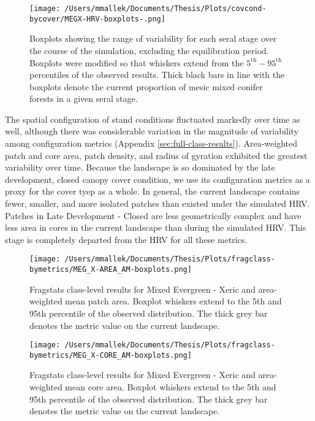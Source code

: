 \begin{figure}[!htbp]
  \centering
    \texttt{[image: /Users/mmallek/Documents/Thesis/Plots/covcond-bycover/MEGX-HRV-boxplots-.png]}
  \caption{Boxplots showing the range of variability for each seral stage over the course of the simulation, excluding the equilibration period. Boxplots were modified so that whiskers extend from the $5^{\text{th}} - 95^{\text{th}}$ percentiles of the observed results. Thick black bars in line with the boxplots denote the current proportion of mesic mixed conifer forests in a given seral stage.} 
  \label{fig:covcond_megx_boxplots}
\end{figure}

The spatial configuration of stand conditions fluctuated markedly over time as well, although there was considerable variation in the magnitude of variability among configuration metrics (Appendix \ref{sec:full-class-results}). Area-weighted patch and core area, patch density, and radius of gyration exhibited the greatest variability over time. Because the landscape is so dominated by the late development, closed canopy cover condition, we use its configuration metrics as a proxy for the cover tyep as a whole. In general, the current landscape contains fewer, smaller, and more isolated patches than existed under the simulated HRV. Patches in Late Development - Closed are less geometrically complex and have less area in cores in the current landscape than during the simulated HRV. This stage is completely departed from the HRV for all these metrics.

\begin{figure}[!htbp]
\centering
    \texttt{[image: /Users/mmallek/Documents/Thesis/Plots/fragclass-bymetrics/MEG\_X-AREA\_AM-boxplots.png]}
  \caption{Fragstats class-level results for Mixed Evergreen - Xeric and area-weighted mean patch area. Boxplot whiskers extend to the 5th and 95th percentile of the observed distribution. The thick grey bar denotes the metric value on the current landscape.}
  \label{fig:megx_areaam}
\end{figure}


\begin{figure}[!htbp]
\centering
    \texttt{[image: /Users/mmallek/Documents/Thesis/Plots/fragclass-bymetrics/MEG\_X-CORE\_AM-boxplots.png]}
  \caption{Fragstats class-level results for Mixed Evergreen - Xeric and area-weighted mean core area. Boxplot whiskers extend to the 5th and 95th percentile of the observed distribution. The thick grey bar denotes the metric value on the current landscape.}
  \label{fig:megx_coream}
\end{figure}



